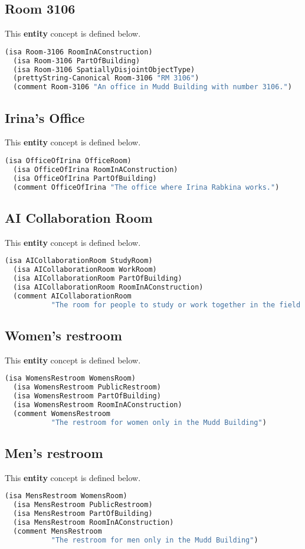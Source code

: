 \documentclass[11pt]{article}
\begin{document}
\subsection{Room 3106}
This \textbf{entity} concept is defined below.
\begin{lstlisting}[language=lisp]
  (isa Room-3106 RoomInAConstruction)
  (isa Room-3106 PartOfBuilding)
  (isa Room-3106 SpatiallyDisjointObjectType)
  (prettyString-Canonical Room-3106 "RM 3106")
  (comment Room-3106 "An office in Mudd Building with number 3106.")
\end{lstlisting}

\subsection{Irina's Office}
This \textbf{entity} concept is defined below.
\begin{lstlisting}[language=lisp]
  (isa OfficeOfIrina OfficeRoom)
  (isa OfficeOfIrina RoomInAConstruction)
  (isa OfficeOfIrina PartOfBuilding)
  (comment OfficeOfIrina "The office where Irina Rabkina works.")
\end{lstlisting}

\subsection{AI Collaboration Room}
This \textbf{entity} concept is defined below.
\begin{lstlisting}[language=lisp]
  (isa AICollaborationRoom StudyRoom)
  (isa AICollaborationRoom WorkRoom)
  (isa AICollaborationRoom PartOfBuilding)
  (isa AICollaborationRoom RoomInAConstruction)
  (comment AICollaborationRoom
           "The room for people to study or work together in the field of AI")
\end{lstlisting}

\subsection{Women's restroom}
This \textbf{entity} concept is defined below.
\begin{lstlisting}[language=lisp]
  (isa WomensRestroom WomensRoom)
  (isa WomensRestroom PublicRestroom)
  (isa WomensRestroom PartOfBuilding)
  (isa WomensRestroom RoomInAConstruction)
  (comment WomensRestroom
           "The restroom for women only in the Mudd Building")
\end{lstlisting}

\subsection{Men's restroom}
This \textbf{entity} concept is defined below.
\begin{lstlisting}[language=lisp]
  (isa MensRestroom WomensRoom)
  (isa MensRestroom PublicRestroom)
  (isa MensRestroom PartOfBuilding)
  (isa MensRestroom RoomInAConstruction)
  (comment MensRestroom
           "The restroom for men only in the Mudd Building")
\end{lstlisting}
\end{document}
